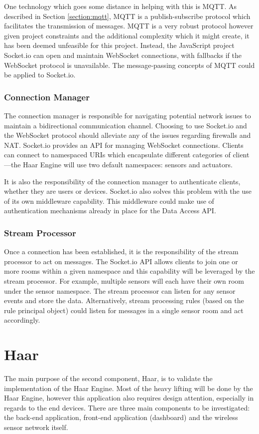       One technology which goes some distance in helping with this is MQTT. As described in Section \ref{section:mqtt}, MQTT is a publish-subscribe protocol which facilitates the transmission of messages. MQTT is a very robust protocol however given project constraints and the additional complexity which it might create, it has been deemed unfeasible for this project. Instead, the JavaScript project Socket.io can open and maintain WebSocket connections, with fallbacks if the WebSocket protocol is unavailable. The message-passing concepts of MQTT could be applied to Socket.io.

      \subsubsection{Connection Manager}
        The connection manager is responsible for navigating potential network issues to maintain a bidirectional communication channel. Choosing to use Socket.io and the WebSocket protocol should alleviate any of the issues regarding firewalls and NAT. Socket.io provides an API for managing WebSocket connections. Clients can connect to namespaced URIs which encapsulate different categories of client---the Haar Engine will use two default namespaces: sensors and actuators.

        It is also the responsibility of the connection manager to authenticate clients, whether they are users or devices. Socket.io also solves this problem with the use of its own middleware capability. This middleware could make use of authentication mechanisms already in place for the Data Access API.

      \subsubsection{Stream Processor}
        Once a connection has been established, it is the responsibility of the stream processor to act on messages. The Socket.io API allows clients to join one or more rooms within a given namespace and this capability will be leveraged by the stream processor. For example, multiple sensors will each have their own room under the sensor namespace. The stream processor can listen for any sensor events and store the data. Alternatively, stream processing rules (based on the rule principal object) could listen for messages in a single sensor room and act accordingly.

  \section{Haar}
    The main purpose of the second component, Haar, is to validate the implementation of the Haar Engine. Most of the heavy lifting will be done by the Haar Engine, however this application also requires design attention, especially in regards to the end devices. There are three main components to be investigated: the back-end application, front-end application (dashboard) and the wireless sensor network itself.

